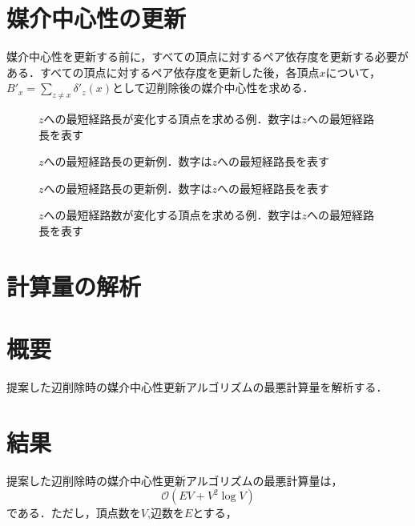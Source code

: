 \section{媒介中心性の更新}
媒介中心性を更新する前に，すべての頂点に対するペア依存度を更新する必要がある．すべての頂点に対するペア依存度を更新した後，各頂点$x$について，$B'_x=\sum_{z\neq x}\delta'_{z}(x)$として辺削除後の媒介中心性を求める．

\begin{figure}[tb]
  \centering
  \def\svgwidth{.35\linewidth}
  
  \caption{$z$への最短経路長が変化する頂点を求める例．数字は$z$への最短経路長を表す}
  \label{fig:decremental-dist-idea-1}
\end{figure}

\begin{figure}[tb]
  \centering
  \def\svgwidth{.35\linewidth}
  
  \caption{$z$への最短経路長の更新例．数字は$z$への最短経路長を表す}
  \label{fig:decremental-dist-idea-2}
\end{figure}

\begin{figure}[tb]
  \centering
  \def\svgwidth{.35\linewidth}
  
  \caption{$z$への最短経路長の更新例．数字は$z$への最短経路長を表す}
  \label{fig:decremental-dist-idea-3}
\end{figure}

\begin{figure}[tb]
  \centering
  \def\svgwidth{.35\linewidth}
  
  \caption{$z$への最短経路数が変化する頂点を求める例．数字は$z$への最短経路長を表す}
  \label{fig:decremental-sigma-idea-1}
\end{figure}

\section{計算量の解析}
\section{概要}

提案した辺削除時の媒介中心性更新アルゴリズムの最悪計算量を解析する．

\section{結果}
提案した辺削除時の媒介中心性更新アルゴリズムの最悪計算量は，
\[ \mathcal{O}(EV+V^2\log V) \]
である．ただし，頂点数を$V$,辺数を$E$とする，

